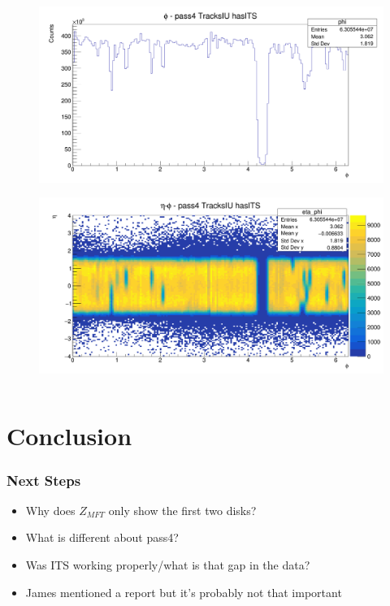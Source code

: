 \documentclass[11pt]{beamer}
\begin{document}
\begin{frame}
\begin{columns}[c]
        \begin{column}{0.5\textwidth}
            \begin{figure}
                \begin{center}
                    \includegraphics[width=\textwidth]{Plots/ITS/phi.png}
                \end{center}
            \end{figure}
            \begin{figure}
                \begin{center}
                    \includegraphics[width=\textwidth]{Plots/ITS/eta-phi.png}
                \end{center}
            \end{figure}
        \end{column}
    \end{columns}

\end{frame}

\section{Conclusion}

\begin{frame}
    \frametitle{Next Steps}

    \begin{itemize}
        \item Why does $Z_{MFT}$ only show the first two disks?
        \item What is different about pass4?
        \item Was ITS working properly/what is that gap in the data?
        \item James mentioned a report but it's probably not that important
    \end{itemize}

\end{frame}
\end{document}
